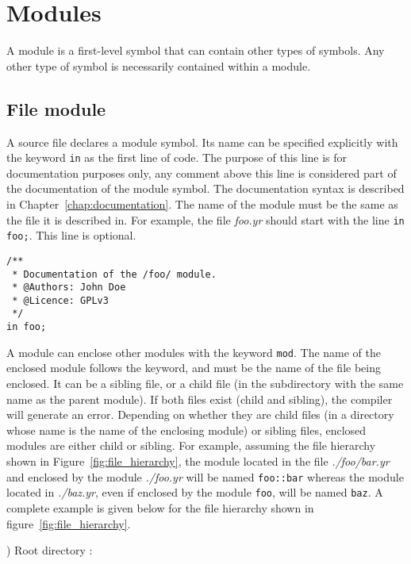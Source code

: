 \section{Modules}%
\label{sec:modules}

A module is a first-level symbol that can contain other types of symbols. Any
other type of symbol is necessarily contained within a module.

\subsection{File module}

A source file declares a module symbol. Its name can be specified explicitly
with the keyword \texttt{in} as the first line of code. The purpose of this line
is for documentation purposes only, any comment above this line is considered
part of the documentation of the module symbol. The documentation syntax is
described in Chapter~\ref{chap:documentation}. The name of the module must
be the same as the file it is described in. For example, the file
\textit{foo.yr} should start with the line \texttt{in foo;}. This line is
optional.


\begin{lstlisting}[style=coloredverbatim]
/**
 * Documentation of the /foo/ module.
 * @Authors: John Doe
 * @Licence: GPLv3
 */
in foo;
\end{lstlisting}

A module can enclose other modules with the keyword \texttt{mod}. The name of
the enclosed module follows the keyword, and must be the name of the file being
enclosed. It can be a sibling file, or a child file (in the subdirectory with
the same name as the parent module). If both files exist (child and sibling),
the compiler will generate an error. Depending on whether they are child files
(in a directory whose name is the name of the enclosing module) or sibling
files, enclosed modules are either child or sibling. For example, assuming the
file hierarchy shown in Figure~\ref{fig:file_hierarchy}, the module located in
the file \textit{./foo/bar.yr} and enclosed by the module \textit{./foo.yr} will
be named \texttt{foo::bar} whereas the module located in \textit{./baz.yr}, even
if enclosed by the module \texttt{foo}, will be named \texttt{baz}. A complete
example is given below for the file hierarchy shown in
figure~\ref{fig:file_hierarchy}.



) Root directory :

